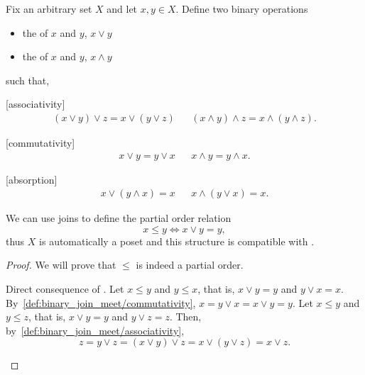 \begin{definition}\label{def:binary_join_meet}
  Fix an arbitrary set \( X \) and let \( x, y \in X \). Define two binary operations
  \begin{itemize}
    \item the  of \( x \) and \( y \), \( x \vee y \)
    \item the  of \( x \) and \( y \), \( x \wedge y \)
  \end{itemize}
  such that,
  \begin{description}
    [associativity]
    \begin{align*}
      (x \vee y) \vee z = x \vee (y \vee z)
      &&
      (x \wedge y) \wedge z = x \wedge (y \wedge z).
    \end{align*}

    [commutativity]
    \begin{align*}
      x \vee y = y \vee x
      &&
      x \wedge y = y \wedge x.
    \end{align*}

    [absorption]
    \begin{align*}
      x \vee (y \wedge x) = x
      &&
      x \wedge (y \vee x) = x.
    \end{align*}
  \end{description}

  We can use joins to define the partial order relation
  \begin{equation*}
    x \leq y \iff x \vee y = y,
  \end{equation*}
  thus \( X \) is automatically a poset and this structure is compatible with .
\end{definition}
\begin{proof}
  We will prove that \( \leq \) is indeed a partial order.
  \begin{description}
     Direct consequence of .
     Let \( x \leq y \) and \( y \leq x \), that is, \( x \vee y = y \) and \( y \vee x = x \). By~\ref{def:binary_join_meet/commutativity}, \( x = y \vee x = x \vee y = y \).
     Let \( x \leq y \) and \( y \leq z \), that is, \( x \vee y = y \) and \( y \vee z = z \). Then, by~\ref{def:binary_join_meet/associativity},
    \begin{equation*}
      z = y \vee z = (x \vee y) \vee z = x \vee (y \vee z) = x \vee z.
    \end{equation*}
  \end{description}
\end{proof}

